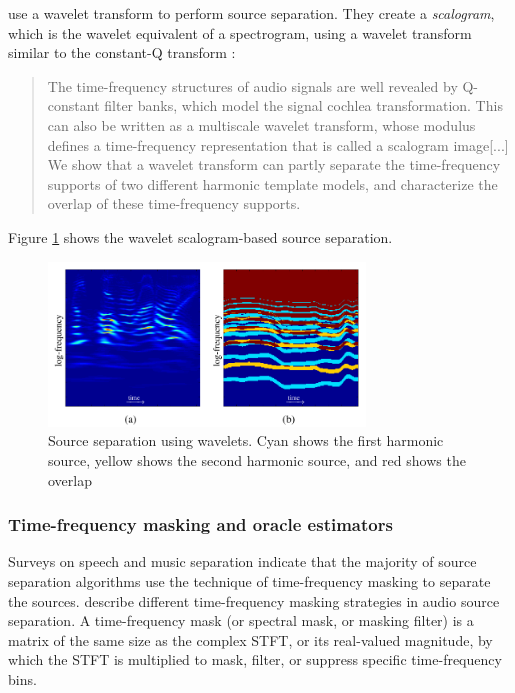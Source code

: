 \documentclass[report.tex]{subfiles}
\begin{document}
\textcite{wavelets} use a wavelet transform to perform source separation. They create a \textit{scalogram}, which is the wavelet equivalent of a spectrogram, using a wavelet transform similar to the constant-Q transform \parencite[2--3]{wavelets}:

\begin{quote}
       The time-frequency structures of audio signals are well revealed by Q-constant filter banks, which model the signal cochlea transformation. This can also be written as a multiscale wavelet transform, whose modulus defines a time-frequency representation that is called a scalogram image[...] We show that a wavelet transform can partly separate the time-frequency supports of two different harmonic template models, and characterize the overlap of these time-frequency supports.
\end{quote}

Figure \ref{fig:waveletsep} shows the wavelet scalogram-based source separation.

\begin{figure}[ht]
       \centering
       \includegraphics[width=0.75\textwidth]{./images-wavelets/wavelet_sep.png}
       \caption{Source separation using wavelets. Cyan shows the first harmonic source, yellow shows the second harmonic source, and red shows the overlap \parencite[5]{wavelets}}
       \label{fig:waveletsep}
\end{figure}

\subsubsection{Time-frequency masking and oracle estimators}
\label{sec:masksandoracles}


Surveys on speech \parencite{speechmask} and music separation \parencite{musicmask} indicate that the majority of source separation algorithms use the technique of time-frequency masking to separate the sources.  \textcite{masking} describe different time-frequency masking strategies in audio source separation. A time-frequency mask (or spectral mask, or masking filter) is a matrix of the same size as the complex STFT, or its real-valued magnitude, by which the STFT is multiplied to mask, filter, or suppress specific time-frequency bins.
\end{document}
